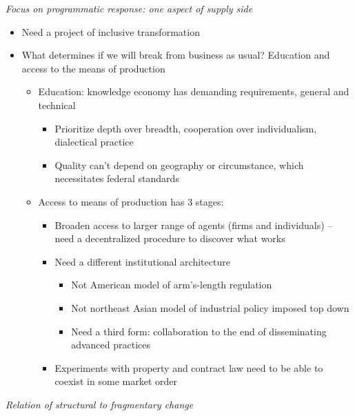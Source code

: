 \emph{Focus on programmatic response: one aspect of supply side}

\begin{itemize}
\tightlist
\item
  Need a project of inclusive transformation
\item
  What determines if we will break from business as usual? Education and
  access to the means of production

  \begin{itemize}
  \tightlist
  \item
    Education: knowledge economy has demanding requirements, general and
    technical

    \begin{itemize}
    \tightlist
    \item
      Prioritize depth over breadth, cooperation over individualism,
      dialectical practice
    \item
      Quality can't depend on geography or circumstance, which
      necessitates federal standards
    \end{itemize}
  \item
    Access to means of production has 3 stages:

    \begin{itemize}
    \tightlist
    \item
      Broaden access to larger range of agents (firms and individuals)
      -- need a decentralized procedure to discover what works
    \item
      Need a different institutional architecture

      \begin{itemize}
      \tightlist
      \item
        Not American model of arm's-length regulation
      \item
        Not northeast Asian model of industrial policy imposed top down
      \item
        Need a third form: collaboration to the end of disseminating
        advanced practices
      \end{itemize}
    \item
      Experiments with property and contract law need to be able to
      coexist in some market order
    \end{itemize}
  \end{itemize}
\end{itemize}

\emph{Relation of structural to fragmentary change}

